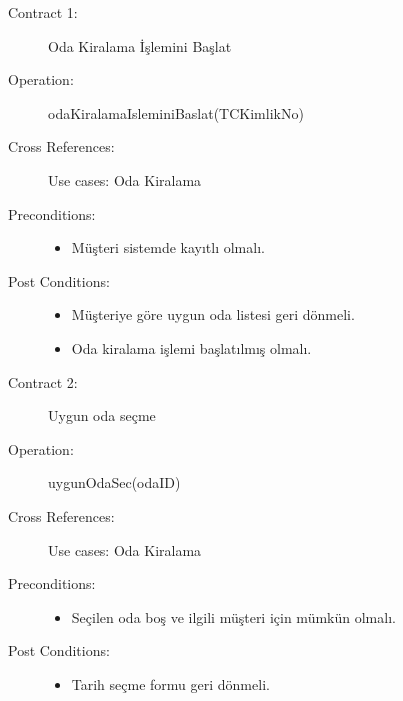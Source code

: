 \documentclass[12pt,a4paper]{report}
\begin{document}
\newpage

\begin{description}
\item[Contract 1:] Oda Kiralama İşlemini Başlat
\item[Operation:] odaKiralamaIsleminiBaslat(TCKimlikNo)
\item[Cross References:] Use cases: Oda Kiralama
\item[Preconditions:] \hspace{10 mm}
\begin{itemize}
\item Müşteri sistemde kayıtlı olmalı.
\end{itemize}
\item[Post Conditions:] \hspace{10 mm}
\begin{itemize} 
\item Müşteriye göre uygun oda listesi geri dönmeli.
\item Oda kiralama işlemi başlatılmış olmalı. \\
\end{itemize}
\end{description}

\begin{description}
\item[Contract 2:] Uygun oda seçme
\item[Operation:] uygunOdaSec(odaID)
\item[Cross References:] Use cases: Oda Kiralama
\item[Preconditions:] \hspace{10 mm}
\begin{itemize}
\item Seçilen oda boş ve ilgili müşteri için mümkün olmalı.
\end{itemize}
\item[Post Conditions:] \hspace{10 mm}
\begin{itemize} 
\item Tarih seçme formu geri dönmeli. \\
\end{itemize}
\end{description}
\end{document}

